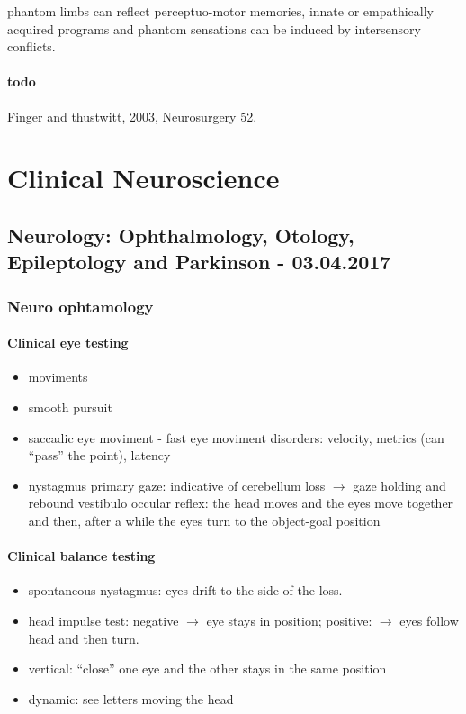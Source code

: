 \documentclass[12pt,article,oneside,a4paper]{memoir}
\begin{document}
phantom limbs can reflect perceptuo-motor memories, innate or empathically
acquired programs and phantom sensations can be induced by intersensory conflicts.

\paragraph{todo} Finger and thustwitt, 2003, Neurosurgery 52.

\newpage
\section{Clinical Neuroscience}

\subsection{Neurology: Ophthalmology, Otology, Epileptology and Parkinson - 03.04.2017}
\subsubsection{Neuro ophtamology}
\paragraph{Clinical eye testing}  
\begin{itemize}
\item moviments
\item smooth pursuit
\item saccadic eye moviment - fast eye moviment
\subitem disorders: velocity, metrics (can ``pass'' the point), latency
\item nystagmus
\subitem primary gaze: indicative of cerebellum loss $\rightarrow$ gaze holding
and rebound
\subitem vestibulo occular reflex: the head moves and the eyes move together
and then, after a while the eyes turn to the object-goal position
\end{itemize}

\paragraph{Clinical balance testing}
\begin{itemize}
\item spontaneous nystagmus: eyes drift to the side of the loss.
\item head impulse test: negative $\rightarrow$ eye stays in position;
positive: $\rightarrow$ eyes follow head and then turn.
\item vertical: ``close'' one eye and the other stays in the same position
\item dynamic: see letters moving the head
\end{itemize}
\end{document}
